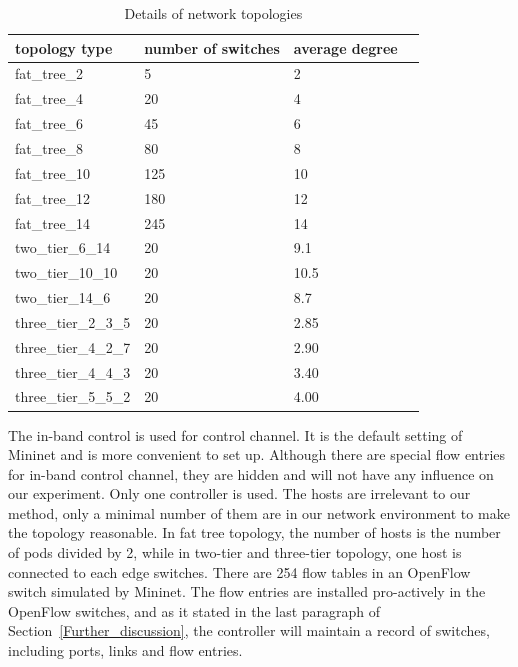 \begin{table}[H]
\centering
\caption{Details of network topologies}
\begin{tabular}{|l|l|l|l|}
\hline topology type & number of switches & average degree \\
\hline
\hline fat\_tree\_2 & 5 & 2 \\
\hline fat\_tree\_4 & 20 & 4 \\
\hline fat\_tree\_6 & 45 & 6 \\
\hline fat\_tree\_8 & 80 & 8 \\
\hline fat\_tree\_10 & 125 & 10 \\
\hline fat\_tree\_12 & 180 & 12 \\
\hline fat\_tree\_14 & 245 & 14 \\
\hline two\_tier\_6\_14 & 20 & 9.1 \\
\hline two\_tier\_10\_10 & 20 & 10.5 \\
\hline two\_tier\_14\_6 & 20 & 8.7 \\
\hline three\_tier\_2\_3\_5 & 20 & 2.85 \\
\hline three\_tier\_4\_2\_7 & 20 & 2.90 \\
\hline three\_tier\_4\_4\_3 & 20 & 3.40 \\
\hline three\_tier\_5\_5\_2 & 20 & 4.00 \\
\hline 
\end{tabular}
\label{table:network_env}
\end{table}

The in-band control is used for control channel. It is the default setting of Mininet and is more convenient to set up. Although there are special flow entries for in-band control channel, they are hidden and will not have any influence on our experiment. Only one controller is used. The hosts are irrelevant to our method, only a minimal number of them are in our network environment to make the topology reasonable. In fat tree topology, the number of hosts is the number of pods divided by 2, while in two-tier and three-tier topology, one host is connected to each edge switches. There are 254 flow tables in an OpenFlow switch simulated by Mininet. The flow entries are installed pro-actively in the OpenFlow switches, and as it stated in the last paragraph of Section~\ref{Further_discussion}, the controller will maintain a record of switches, including ports, links and flow entries. 

